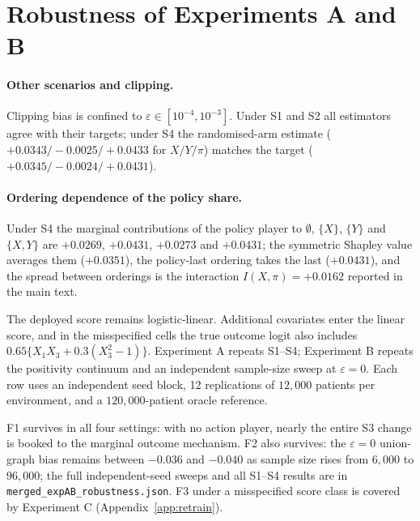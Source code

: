 \documentclass[letterpaper]{article} %
\begin{document}
\section{Robustness of Experiments A and B}
\label{app:robustness}
\paragraph{Other scenarios and clipping.} Clipping bias is confined to $\varepsilon \in [10^{-4}, 10^{-3}]$. Under S1 and S2 all estimators agree with
their targets; under S4 the
randomised-arm estimate ($+0.0343 / -0.0025 / +0.0433$ for $X / Y / \pi$)
matches the target ($+0.0345 / -0.0024 / +0.0431$).

\paragraph{Ordering dependence of the policy share.} Under S4 the marginal
contributions of the policy player to $\emptyset$, $\{X\}$, $\{Y\}$ and
$\{X, Y\}$ are $+0.0269$, $+0.0431$, $+0.0273$ and $+0.0431$; the symmetric
Shapley value averages them ($+0.0351$), the policy-last ordering takes the
last ($+0.0431$), and the spread between orderings is the interaction
$I(X, \pi) = +0.0162$ reported in the main text.

The deployed score remains logistic-linear. Additional covariates enter the
linear score, and in the misspecified cells the true outcome logit also includes
$0.65\{X_1X_3+0.3(X_3^2-1)\}$. Experiment A repeats S1--S4; Experiment B
repeats the positivity continuum and an independent sample-size sweep at
$\varepsilon=0$. Each row uses an independent seed block, 12 replications of
$12{,}000$ patients per environment, and a $120{,}000$-patient oracle reference.


F1 survives in all four settings: with no action player, nearly the entire S3
change is booked to the marginal outcome mechanism. F2 also survives: the
$\varepsilon=0$ union-graph bias remains between $-0.036$ and $-0.040$ as
sample size rises from $6{,}000$ to $96{,}000$; the full independent-seed
sweeps and all S1--S4 results are in \texttt{merged\_expAB\_robustness.json}.
F3 under a misspecified score class is covered by Experiment C (Appendix~\ref{app:retrain}).
\end{document}
